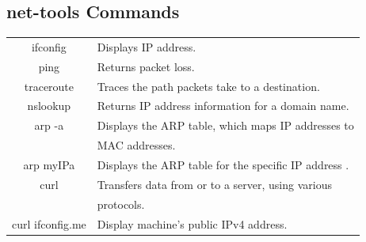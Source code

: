 \documentclass[5pt]{article}
\begin{document}
\begin{multicols}{2}
\subsection{net-tools Commands}
\begin{tabular}{C L}
  ifconfig    & Displays IP address.\\
  ping        & Returns packet loss.\\
  traceroute  & Traces the path packets take to a destination.\\
  nslookup    & Returns IP address information for a domain name.\\
  arp -a      & Displays the ARP table, which maps IP addresses to\\
              & MAC addresses.\\
  arp myIPa   & Displays the ARP table for the specific IP address .\\
  curl        & Transfers data from or to a server, using various\\
              & protocols.\\
  curl ifconfig.me    & Display machine's public IPv4 address.\\
\end{tabular}

\end{multicols}
\end{document}
